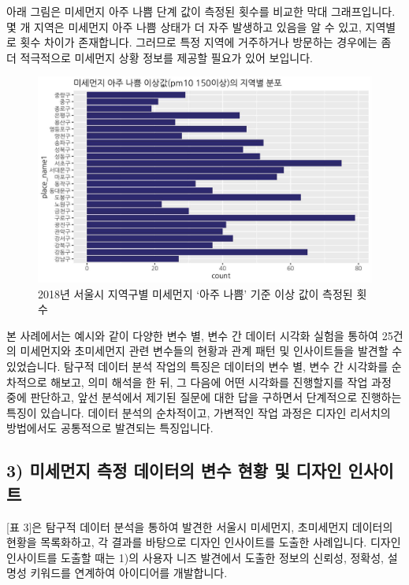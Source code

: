 \documentclass[
  letterpaper,
]{book}
\begin{document}
아래 그림은 미세먼지 아주 나쁨 단계 값이 측정된 횟수를 비교한 막대
그래프입니다. 몇 개 지역은 미세먼지 아주 나쁨 상태가 더 자주 발생하고
있음을 알 수 있고, 지역별로 횟수 차이가 존재합니다. 그러므로 특정 지역에
거주하거나 방문하는 경우에는 좀 더 적극적으로 미세먼지 상황 정보를
제공할 필요가 있어 보입니다.

\begin{figure}[H]

{\centering \includegraphics{img/fig7.png}

}

\caption{2018년 서울시 지역구별 미세먼지 `아주 나쁨' 기준 이상 값이
측정된 횟수}

\end{figure}%

본 사례에서는 예시와 같이 다양한 변수 별, 변수 간 데이터 시각화 실험을
통하여 25건의 미세먼지와 초미세먼지 관련 변수들의 현황과 관계 패턴 및
인사이트들을 발견할 수 있었습니다. 탐구적 데이터 분석 작업의 특징은
데이터의 변수 별, 변수 간 시각화를 순차적으로 해보고, 의미 해석을 한 뒤,
그 다음에 어떤 시각화를 진행할지를 작업 과정 중에 판단하고, 앞선
분석에서 제기된 질문에 대한 답을 구하면서 단계적으로 진행하는 특징이
있습니다. 데이터 분석의 순차적이고, 가변적인 작업 과정은 디자인 리서치의
방법에서도 공통적으로 발견되는 특징입니다.

\subsection{3) 미세먼지 측정 데이터의 변수 현황 및 디자인
인사이트}\label{uxbbf8uxc138uxba3cuxc9c0-uxce21uxc815-uxb370uxc774uxd130uxc758-uxbcc0uxc218-uxd604uxd669-uxbc0f-uxb514uxc790uxc778-uxc778uxc0acuxc774uxd2b8}

{[}표 3{]}은 탐구적 데이터 분석을 통하여 발견한 서울시 미세먼지,
초미세먼지 데이터의 현황을 목록화하고, 각 결과를 바탕으로 디자인
인사이트를 도출한 사례입니다. 디자인 인사이트를 도출할 때는 1)의 사용자
니즈 발견에서 도출한 정보의 신뢰성, 정확성, 설명성 키워드를 연계하여
아이디어를 개발합니다.
\end{document}
